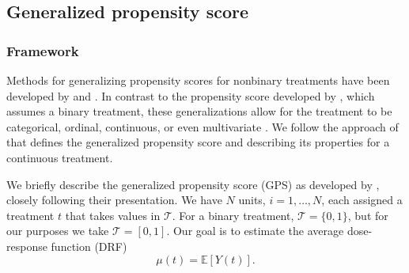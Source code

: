 \documentclass[11pt,a4paper]{article}
\begin{document}
%
%
%

\subsection{Generalized propensity score}
\subsubsection{Framework}
Methods for generalizing propensity scores for nonbinary treatments have been developed by \cite{imai_vandyk} and \cite{hirano_imbens}. In contrast to the propensity score developed by \cite{rosenbaum_rubin}, which assumes a binary treatment, these generalizations allow for the treatment to be categorical, ordinal, continuous, or even multivariate \citep{imai_vandyk}. We follow the approach of \cite{hirano_imbens} that defines the generalized propensity score and describing its properties for a continuous treatment.

We briefly describe the generalized propensity score (GPS) as developed by \cite{hirano_imbens}, closely following their presentation. We have $N$ units, $i = 1, \ldots, N$, each assigned a treatment $t$ that takes values in $\mathcal{T}$. For a binary treatment, $\mathcal{T} = \{0, 1\}$, but for our purposes we take $\mathcal{T} = [0, 1]$. Our goal is to estimate the average dose-response function (DRF)
\begin{equation}\label{eq:drf}
	\mu(t) = \mathbb{E}[Y(t)].
\end{equation}
\end{document}
